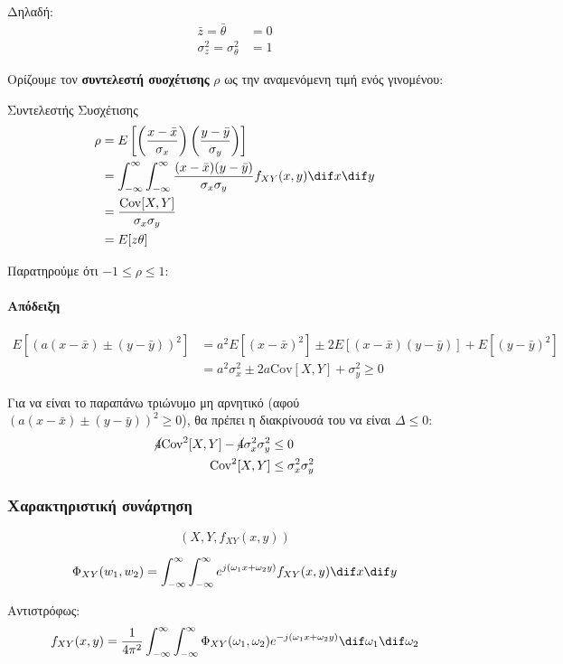 \documentclass[11pt,a4paper,notitlepage,fleqn,final]{article}
\begin{document}
Δηλαδή:
\begin{align*}
\bar z = \bar \theta &= 0 \\
\sigma_z^2 = \sigma_\theta^2 &= 1
\end{align*}

Ορίζουμε τον \textbf{συντελεστή συσχέτισης} \( \rho \) ως την αναμενόμενη
τιμή ενός γινομένου:
\begin{defn}{Συντελεστής Συσχέτισης}{}
	\begin{align*}
	\rho &= E\left[\left(
	\frac{x-\bar x}{\sigma_x}
	\right)\left(
	\frac{y-\bar y}{\sigma_y}
	\right)
	\right] \\ &= \int_{-\infty}^{\infty} \int_{-\infty}^{\infty}
	\frac{(x-\bar x)(y-\bar y)}{\sigma_x \sigma_y}f_{XY}(x,y)\dif x
	\dif y \\
	&= \frac{\mathrm{Cov}[X,Y]}{\sigma_x\sigma_y}\\
	&= E[z\theta]
	\end{align*}
\end{defn}

Παρατηρούμε ότι \( -1 \leq \rho \leq 1 \):
\paragraph{Απόδειξη}
\begin{align*}
E\left[
\left(a(x-\bar x)\pm (y-\bar y)\right)^2
\right] &=
a^2E\left[(x-\bar x)^2\right] \pm 2E\left[(x-\bar x)(y-\bar y)\right]
+E\left[(y-\bar y)^2\right]
\\ &= a^2\sigma_x^2 \pm 2a\mathrm{Cov}[X,Y] + \sigma_y^2 \geq 0
\end{align*}

Για να είναι το παραπάνω τριώνυμο μη αρνητικό
(αφού \( \left(a(x-\bar x)\pm(y-\bar y)\right)^2 \geq 0 \)),
θα πρέπει η διακρίνουσά
του να είναι \( \Delta \leq 0 \):
\begin{align*}
	\cancel{4}\mathrm{Cov}^2[X,Y]-\cancel{4}\sigma_x^2\sigma_y^2 &\leq 0
	\\
	\mathrm{Cov}^2[X,Y]&\leq \sigma_x^2\sigma_y^2
\end{align*}

\subsubsection{Χαρακτηριστική συνάρτηση}
\[
(X,Y,f_{XY}(x,y))
\]
\begin{defn}{}{}
    \[
    \Phi_{XY}(w_1,w_2) = \int_{-\infty}^{\infty} \int_{-\infty}^{\infty}
    e^{j(\omega_1 x + \omega_2 y)} f_{XY}(x,y)\dif x\dif y
    \]
\end{defn}
Αντιστρόφως:\[
f_{XY}(x,y) = \frac{1}{4\pi^2} \int_{-\infty}^{\infty}
\int_{-\infty}^{\infty}
\Phi_{XY}(\omega_1,\omega_2) e^{-j(\omega_1 x + \omega_2 y)}
\dif \omega_1 \dif \omega_2
\]
\end{document}

